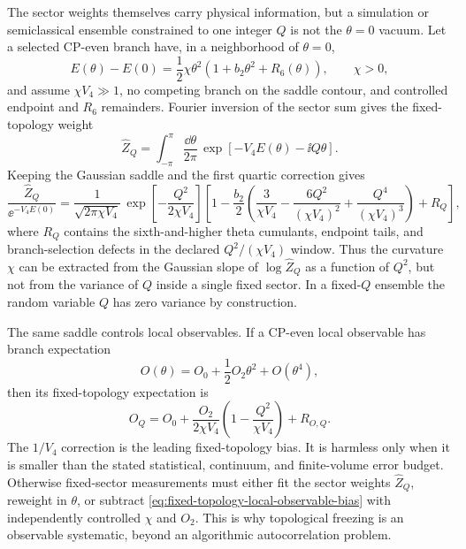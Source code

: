\begin{controlledapproximation}
\label{ca:fixed-topology-theta-extraction}
The sector weights themselves carry physical information, but a simulation or
semiclassical ensemble constrained to one integer \(Q\) is not the
\(\theta=0\) vacuum.  Let a selected CP-even branch have, in a neighborhood of
\(\theta=0\),
\begin{equation}
  E(\theta)-E(0)
  =
  \frac12\chi\theta^2
  \left(1+b_2\theta^2+R_6(\theta)\right),
  \qquad \chi>0 ,
  \label{eq:theta-fixed-topology-branch-expansion}
\end{equation}
and assume \(\chi V_4\gg1\), no competing branch on the saddle contour, and
controlled endpoint and \(R_6\) remainders.  Fourier inversion of the sector
sum gives the fixed-topology weight
\begin{equation}
  \widehat Z_Q
  =
  \int_{-\pi}^{\pi}\frac{\dd\theta}{2\pi}\,
  \exp\!\left[-V_4E(\theta)-\ii Q\theta\right].
  \label{eq:fixed-topology-fourier-inversion}
\end{equation}
Keeping the Gaussian saddle and the first quartic correction gives
\begin{equation}
  \frac{\widehat Z_Q}{\ee^{-V_4E(0)}}
  =
  \frac{1}{\sqrt{2\pi\chi V_4}}\,
  \exp\!\left[-\frac{Q^2}{2\chi V_4}\right]
  \left[
    1-\frac{b_2}{2}
    \left(
      \frac{3}{\chi V_4}
      -\frac{6Q^2}{(\chi V_4)^2}
      +\frac{Q^4}{(\chi V_4)^3}
    \right)
    +R_Q
  \right],
  \label{eq:fixed-topology-gaussian-sector-weight}
\end{equation}
where \(R_Q\) contains the sixth-and-higher theta cumulants, endpoint tails,
and branch-selection defects in the declared \(Q^2/(\chi V_4)\) window.
Thus the curvature \(\chi\) can be extracted from the Gaussian slope of
\(\log\widehat Z_Q\) as a function of \(Q^2\), but not from the variance of
\(Q\) inside a single fixed sector.  In a fixed-\(Q\) ensemble the random
variable \(Q\) has zero variance by construction.

The same saddle controls local observables.  If a CP-even local observable has
branch expectation
\[
  O(\theta)=O_0+\frac12 O_2\theta^2+O(\theta^4),
\]
then its fixed-topology expectation is
\begin{equation}
  O_Q
  =
  O_0
  +
  \frac{O_2}{2\chi V_4}
  \left(
    1-\frac{Q^2}{\chi V_4}
  \right)
  +R_{O,Q}.
  \label{eq:fixed-topology-local-observable-bias}
\end{equation}
The \(1/V_4\) correction is the leading fixed-topology bias.  It is harmless
only when it is smaller than the stated statistical, continuum, and
finite-volume error budget.  Otherwise fixed-sector measurements must either
fit the sector weights \(\widehat Z_Q\), reweight in \(\theta\), or subtract
\eqref{eq:fixed-topology-local-observable-bias} with independently controlled
\(\chi\) and \(O_2\).  This is why topological freezing is an observable
systematic, beyond an algorithmic autocorrelation problem.
\end{controlledapproximation}

